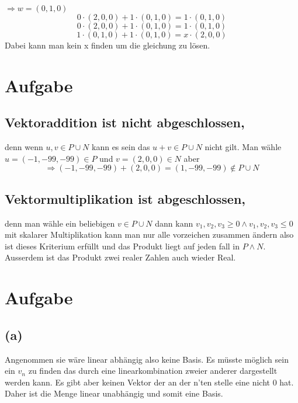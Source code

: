 \documentclass{article}
\begin{document}
\(\Rightarrow w = (0, 1, 0)\)
\[0 \cdot (2,0,0) + 1 \cdot (0,1,0) = 1 \cdot (0,1,0)\]
\[0 \cdot (2,0,0) + 1 \cdot (0,1,0) = 1 \cdot (0, 1,0)\]
\[1 \cdot (0,1,0) + 1 \cdot (0,1,0) = x \cdot (2,0,0) 
\]
Dabei kann man kein x finden um die gleichung zu lösen.

\section{Aufgabe}
\subsection*{Vektoraddition ist nicht abgeschlossen, }
denn wenn \(u,v \in P \cup N\) kann es sein das \(u + v \in P \cup N\) nicht gilt. Man wähle \(u = (-1, -99, -99) \in P\) und \(v = (2, 0, 0) \in N\)
aber 
\[\Rightarrow (-1, -99, -99) + (2, 0, 0) = (1,-99, -99)\not \in P\cup N\]
\subsection*{Vektormultiplikation ist abgeschlossen,}denn man wähle ein beliebigen \(v \in P \cup N\) dann kann \(v_1, v_2, v_3 \geq 0 \wedge v_1, v_2, v_3 \leq 0\) mit skalarer Multiplikation kann man nur alle vorzeichen zusammen ändern also ist dieses Kriterium erfüllt und das Produkt liegt auf jeden fall in \(P \wedge N\). Ausserdem ist das Produkt zwei realer Zahlen auch wieder Real. 

\section{Aufgabe}
\subsection*{(a)}
Angenommen sie wäre linear abhängig also keine Basis. Es müsste möglich sein ein \(v_n\) zu finden das durch eine linearkombination zweier anderer dargestellt werden kann. Es gibt aber keinen Vektor der an der n'ten stelle eine nicht 0 hat. Daher ist die Menge linear unabhängig und somit eine Basis.

\end{document}
